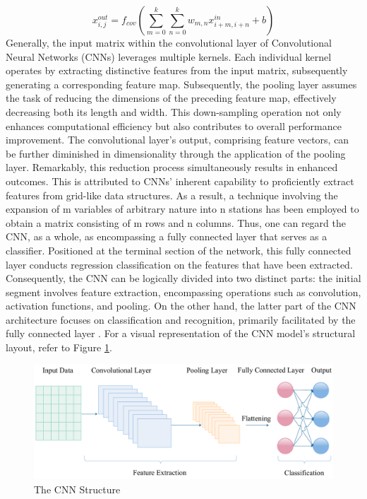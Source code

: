\documentclass{article}
\begin{document}
\begin{equation}
x_{i,j}^{out}=f_{cov}(\sum_{m=0}^k \sum_{n=0}^k w_{m,n}x_{i+m,i+n}^{in} + b)
\end{equation}
Generally, the input matrix within the convolutional layer of Convolutional Neural Networks (CNNs) leverages multiple kernels. Each individual kernel operates by extracting distinctive features from the input matrix, subsequently generating a corresponding feature map. Subsequently, the pooling layer assumes the task of reducing the dimensions of the preceding feature map, effectively decreasing both its length and width. This down-sampling operation not only enhances computational efficiency but also contributes to overall performance improvement. The convolutional layer's output, comprising feature vectors, can be further diminished in dimensionality through the application of the pooling layer. Remarkably, this reduction process simultaneously results in enhanced outcomes. This is attributed to CNNs' inherent capability to proficiently extract features from grid-like data structures. As a result, a technique involving the expansion of m variables of arbitrary nature into n stations has been employed to obtain a matrix consisting of m rows and n columns. Thus, one can regard the CNN, as a whole, as encompassing a fully connected layer that serves as a classifier. Positioned at the terminal section of the network, this fully connected layer conducts regression classification on the features that have been extracted. Consequently, the CNN can be logically divided into two distinct parts: the initial segment involves feature extraction, encompassing operations such as convolution, activation functions, and pooling. On the other hand, the latter part of the CNN architecture focuses on classification and recognition, primarily facilitated by the fully connected layer  \cite{yao2021optimal}. For a visual representation of the CNN model's structural layout,  refer to  Figure \ref{1}. 
\begin{figure}
	\centering
	\includegraphics [width=5.7 in] {CNN.pdf}
	\caption{The CNN Structure}
	\label{1}
\end{figure}
\end{document}

